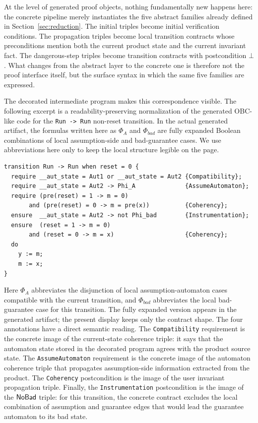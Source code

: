 \documentclass[acmsmall,screen]{acmart}
\theoremstyle{leftplain}
\theoremstyle{leftdefinition}
\theoremstyle{leftremark}
\begin{document}
At the level of generated proof objects, nothing fundamentally new happens
here: the concrete pipeline merely instantiates the five abstract families
already defined in Section~\ref{sec:reduction}. The initial triples become
initial verification conditions. The propagation triples become local
transition contracts whose preconditions mention both the current product
state and the current invariant fact. The dangerous-step triples become
transition contracts with postcondition $\bot$. What changes from the abstract
layer to the concrete one is therefore not the proof interface itself, but the
surface syntax in which the same five families are expressed.

The decorated intermediate program makes this correspondence visible. The
following excerpt is a readability-preserving normalization of the generated
OBC-like code for the \lstinline|Run -> Run| non-reset transition. In the
actual generated artifact, the formulas written here as $\Phi_A$ and
$\Phi_{\mathit{bad}}$ are fully expanded Boolean combinations of local
assumption-side and bad-guarantee cases. We use abbreviations here only to
keep the local structure legible on the page.

\begin{lstlisting}[basicstyle=\ttfamily\scriptsize,frame=single]
transition Run -> Run when reset = 0 {
  require __aut_state = Aut1 or __aut_state = Aut2 {Compatibility};
  require __aut_state = Aut2 -> Phi_A              {AssumeAutomaton};
  require (pre(reset) = 1 -> m = 0)
       and (pre(reset) = 0 -> m = pre(x))          {Coherency};
  ensure  __aut_state = Aut2 -> not Phi_bad        {Instrumentation};
  ensure  (reset = 1 -> m = 0)
       and (reset = 0 -> m = x)                    {Coherency};
  do
    y := m;
    m := x;
}
\end{lstlisting}

Here $\Phi_A$ abbreviates the disjunction of local assumption-automaton cases
compatible with the current transition, and $\Phi_{\mathit{bad}}$ abbreviates
the local bad-guarantee case for this transition. The fully expanded version
appears in the generated artifact; the present display keeps only the contract
shape. The four annotations have a
direct semantic reading. The \texttt{Compatibility} requirement is the concrete
image of the current-state coherence triple: it says that the automaton state
stored in the decorated program agrees with the product source state. The
\texttt{AssumeAutomaton} requirement is the concrete image of the automaton
coherence triple that propagates assumption-side information extracted from the
product. The \texttt{Coherency} postcondition is the image of the user
invariant propagation triple. Finally, the \texttt{Instrumentation}
postcondition is the image of the $\mathsf{NoBad}$ triple: for this transition, the
concrete contract excludes the local combination of assumption and guarantee
edges that would lead the guarantee automaton to its bad state.
\end{document}
